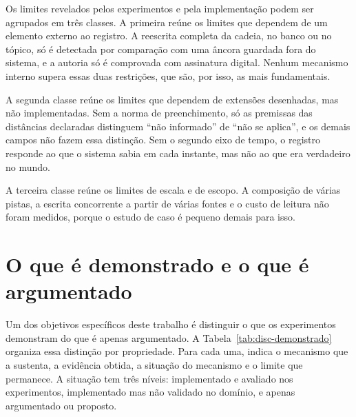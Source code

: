 Os limites revelados pelos experimentos e pela implementação podem ser agrupados em três classes. A primeira reúne os limites que dependem de um elemento externo ao registro. A reescrita completa da cadeia, no banco ou no tópico, só é detectada por comparação com uma âncora guardada fora do sistema, e a autoria só é comprovada com assinatura digital. Nenhum mecanismo interno supera essas duas restrições, que são, por isso, as mais fundamentais.

A segunda classe reúne os limites que dependem de extensões desenhadas, mas não implementadas. Sem a norma de preenchimento, só as premissas das distâncias declaradas distinguem ``não informado'' de ``não se aplica'', e os demais campos não fazem essa distinção. Sem o segundo eixo de tempo, o registro responde ao que o sistema sabia em cada instante, mas não ao que era verdadeiro no mundo.

A terceira classe reúne os limites de escala e de escopo. A composição de várias pistas, a escrita concorrente a partir de várias fontes e o custo de leitura não foram medidos, porque o estudo de caso é pequeno demais para isso.

\section{O que é demonstrado e o que é argumentado}\label{sec:disc-demonstrado}

Um dos objetivos específicos deste trabalho é distinguir o que os experimentos demonstram do que é apenas argumentado. A Tabela~\ref{tab:disc-demonstrado} organiza essa distinção por propriedade. Para cada uma, indica o mecanismo que a sustenta, a evidência obtida, a situação do mecanismo e o limite que permanece. A situação tem três níveis: implementado e avaliado nos experimentos, implementado mas não validado no domínio, e apenas argumentado ou proposto.

